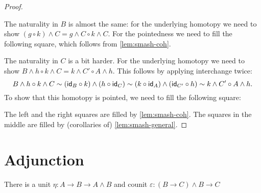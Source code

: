 \documentclass{article}
\newcommand{\pmap}{\to}
\renewcommand{\smash}{\wedge}
\renewcommand{\epsilon}{\varepsilon}
\renewcommand{\o}{\ensuremath{\circ}}
\begin{document}
\begin{proof}
\begin{center}
\end{center}
The naturality in $B$ is almost the same: for the underlying homotopy we need to show
$(g \o k)\smash C = g\smash C \o k\smash C$. For the pointedness we need to fill the following
square, which follows from \autoref{lem:smash-coh}.
\begin{center}
\end{center}
The naturality in $C$ is a bit harder. For the underlying homotopy we need to show
$B\smash h\o k\smash C=k\smash C'\o A\smash h$. This follows by applying interchange twice:
$$B\smash h\o k\smash C\sim(\idfunc[B]\o k)\smash(h\o\idfunc[C])\sim(k\o\idfunc[A])\smash(\idfunc[C']\o h)\sim k\smash C'\o A\smash h.$$
To show that this homotopy is pointed, we need to fill the following square:
\begin{center}
\end{center}
The left and the right squares are filled by \autoref{lem:smash-coh}. The squares in the middle
are filled by (corollaries of) \autoref{lem:smash-general}.
\end{proof}

\section{Adjunction}

\begin{defn}
There is a unit $\eta:A\pmap B\pmap A\smash B$ and counit $\epsilon : (B\pmap C)\smash B \pmap C$
\end{defn}
\end{document}
